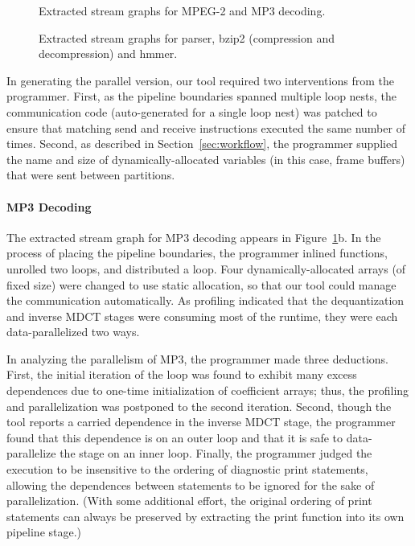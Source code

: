 \begin{figure}[t]
\centering
\vspace{-6pt}
\caption{Extracted stream graphs for MPEG-2 and MP3 decoding.\protect\label{fig:mpeg2-mp3-graphs}}
\vspace{-10pt}
\end{figure}

\begin{figure*}[t]
\centering
{}
\caption[Extracted stream graphs for parser, bzip2, and
  hmmer.]{Extracted stream graphs for parser, bzip2 (compression and
  decompression) and hmmer.  \protect\label{fig:spec-graphs}}
\end{figure*}

In generating the parallel version, our tool required two
interventions from the programmer.  First, as the pipeline boundaries
spanned multiple loop nests, the communication code (auto-generated
for a single loop nest) was patched to ensure that matching send and
receive instructions executed the same number of times.  Second, as
described in Section~\ref{sec:workflow}, the programmer supplied the
name and size of dynamically-allocated variables (in this case, frame
buffers) that were sent between partitions.

\paragraph*{MP3 Decoding} The extracted stream graph for MP3 decoding
appears in Figure~\ref{fig:mpeg2-mp3-graphs}b.  In the process of
placing the pipeline boundaries, the programmer inlined functions,
unrolled two loops, and distributed a loop.  Four
dynamically-allocated arrays (of fixed size) were changed to use
static allocation, so that our tool could manage the communication
automatically.  As profiling indicated that the dequantization and
inverse MDCT stages were consuming most of the runtime, they were each
data-parallelized two ways.

In analyzing the parallelism of MP3, the programmer made three
deductions.  First, the initial iteration of the loop was found to
exhibit many excess dependences due to one-time initialization of
coefficient arrays; thus, the profiling and parallelization was
postponed to the second iteration.  Second, though the tool reports a
carried dependence in the inverse MDCT stage, the programmer found
that this dependence is on an outer loop and that it is safe to
data-parallelize the stage on an inner loop.  Finally, the programmer
judged the execution to be insensitive to the ordering of diagnostic
print statements, allowing the dependences between statements to be
ignored for the sake of parallelization.  (With some additional
effort, the original ordering of print statements can always be
preserved by extracting the print function into its own pipeline
stage.)

